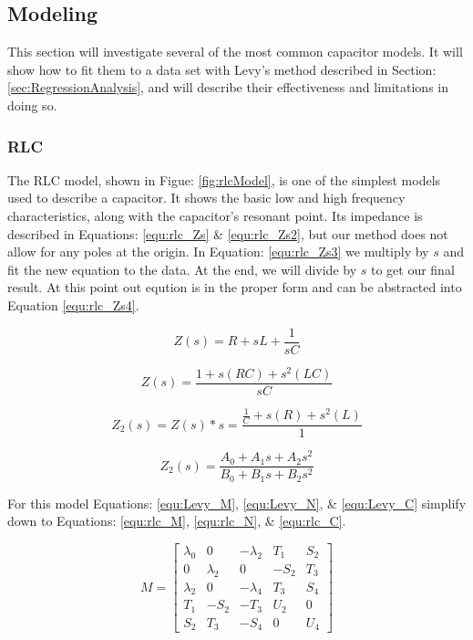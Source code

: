 


\subsection{Modeling}
This section will investigate several of the most common capacitor models. It will show how to fit them to a data set with Levy's method described in Section: \ref{sec:RegressionAnalysis}, and will describe their effectiveness and limitations in doing so.

\subsubsection{RLC}


The RLC model, shown in Figue: \ref{fig:rlcModel}, is one of the simplest models used to describe a capacitor. It shows the basic low and high frequency characteristics, along with the capacitor's resonant point. Its impedance is described in Equations: \eqref{equ:rlc_Zs} \& \eqref{equ:rlc_Zs2}, but our method does not allow for any poles at the origin. In Equation: \eqref{equ:rlc_Zs3} we multiply by $s$ and fit the new equation to the data. At the end, we will divide by $s$ to get our final result. At this point out eqution is in the proper form and can be abstracted into Equation \eqref{equ:rlc_Zs4}.

\begin{equation}
\label{equ:rlc_Zs}
Z(s) = R + sL + \frac{1}{sC}
\end{equation}

\begin{equation}
\label{equ:rlc_Zs2}
Z(s) = \frac{1 + s(RC) + s^2 (LC)}{sC}
\end{equation}

\begin{equation}
\label{equ:rlc_Zs3}
Z_2(s) = Z(s) * s =  \frac{\frac{1}{C} + s(R) + s^2 (L)}{1}
\end{equation}

\begin{equation}
\label{equ:rlc_Zs4}
Z_2(s) = \frac{A_0 + A_1 s + A_2 s^2}{B_0 + B_1 s + B_2 s^2}
\end{equation}

For this model Equations: \eqref{equ:Levy_M}, \eqref{equ:Levy_N}, \& \eqref{equ:Levy_C} simplify down to Equations: \eqref{equ:rlc_M}, \eqref{equ:rlc_N}, \& \eqref{equ:rlc_C}.

\begin{equation}
\label{equ:rlc_M}
M = 
\begin{bmatrix}
\lambda _0 & 0          & -\lambda _2 &  T_1    & S_2 \\
0          & \lambda _2 & 0           & -S_2    & T_3 \\
\lambda _2 & 0          & -\lambda _4 &  T_3    & S_4 \\
T_1        & -S_2       & -T_3        &  U_2    & 0   \\
S_2        &  T_3       & -S_4        &  0      & U_4
\end{bmatrix}
\end{equation}

